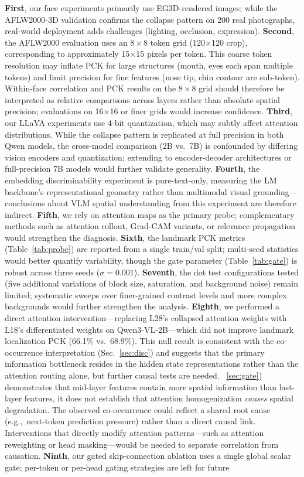\documentclass[10pt,twocolumn,letterpaper]{article}
\begin{document}
\textbf{First}, our face experiments primarily use EG3D-rendered images; while the AFLW2000-3D validation confirms the collapse pattern on 200 real photographs, real-world deployment adds challenges (lighting, occlusion, expression). \textbf{Second}, the AFLW2000 evaluation uses an $8\times8$ token grid (120$\times$120 crop), corresponding to approximately 15$\times$15 pixels per token. This coarse token resolution may inflate PCK for large structures (mouth, eyes each span multiple tokens) and limit precision for fine features (nose tip, chin contour are sub-token). Within-face correlation and PCK results on the $8\times8$ grid should therefore be interpreted as relative comparisons across layers rather than absolute spatial precision; evaluations on 16$\times$16 or finer grids would increase confidence. \textbf{Third}, our LLaVA experiments use 4-bit quantization, which may subtly affect attention distributions. While the collapse pattern is replicated at full precision in both Qwen models, the cross-model comparison (2B vs.\ 7B) is confounded by differing vision encoders and quantization; extending to encoder-decoder architectures or full-precision 7B models would further validate generality. \textbf{Fourth}, the embedding discriminability experiment is pure-text-only, measuring the LM backbone's representational geometry rather than multimodal visual grounding---conclusions about VLM spatial understanding from this experiment are therefore indirect. \textbf{Fifth}, we rely on attention maps as the primary probe; complementary methods such as attention rollout, Grad-CAM variants, or relevance propagation would strengthen the diagnosis. \textbf{Sixth}, the landmark PCK metrics (Table~\ref{tab:probe}) are reported from a single train/val split; multi-seed statistics would better quantify variability, though the gate parameter (Table~\ref{tab:gate}) is robust across three seeds ($\sigma = 0.001$). \textbf{Seventh}, the dot test configurations tested (five additional variations of block size, saturation, and background noise) remain limited; systematic sweeps over finer-grained contrast levels and more complex backgrounds would further strengthen the analysis. \textbf{Eighth}, we performed a direct attention intervention---replacing L28's collapsed attention weights with L18's differentiated weights on Qwen3-VL-2B---which did not improve landmark localization PCK (66.1\% vs.~68.9\%). This null result is consistent with the co-occurrence interpretation (Sec.~\ref{sec:disc}) and suggests that the primary information bottleneck resides in the hidden state representations rather than the attention routing alone, but further causal tests are needed. ~\ref{sec:gate}) demonstrates that mid-layer features contain more spatial information than last-layer features, it does not establish that attention homogenization \emph{causes} spatial degradation. The observed co-occurrence could reflect a shared root cause (e.g.,~next-token prediction pressure) rather than a direct causal link. Interventions that directly modify attention patterns---such as attention reweighting or head masking---would be needed to separate correlation from causation. \textbf{Ninth}, our gated skip-connection ablation uses a single global scalar gate; per-token or per-head gating strategies are left for future 
\end{document}
